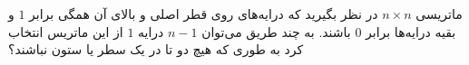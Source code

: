 \EXERCISE
ماتریسی 
$n \times n$
در نظر بگیرید که درایه‌های روی قطر اصلی و بالای آن همگی برابر 
$1$
 و بقیه درایه‌ها برابر 
$0$
  باشند. به چند طریق می‌توان 
$n - 1$
  درایه 
$1$
   از این ماتریس انتخاب کرد به طوری که هیچ دو تا در یک سطر یا ستون نباشند؟